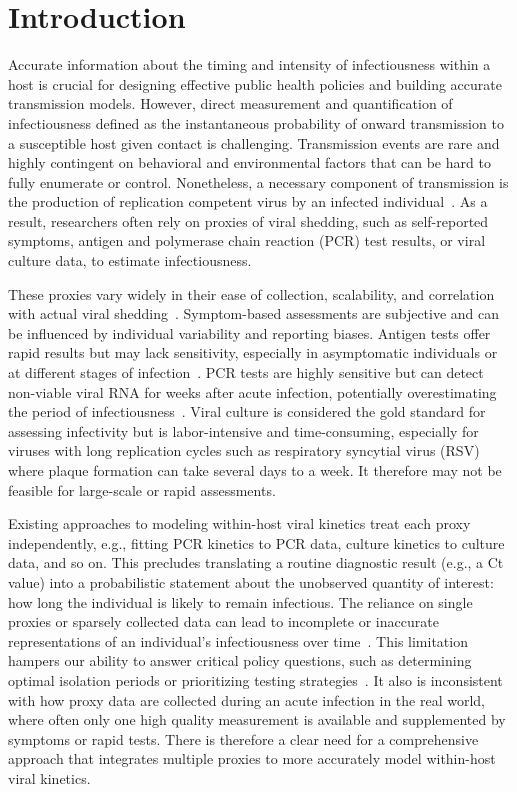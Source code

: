 \documentclass[12pt]{article}
\begin{document}
\section{Introduction} \label{sec:introduction}
Accurate information about the timing and intensity of infectiousness within a host is crucial for designing effective public health policies and building accurate transmission models. However, direct measurement and quantification of infectiousness \textemdash defined as the instantaneous probability of onward transmission to a susceptible host given contact \textemdash is challenging. Transmission events are rare and highly contingent on behavioral and environmental factors that can be hard to fully enumerate or control. Nonetheless, a necessary component of transmission is the production of replication competent virus by an infected individual~\cite{watson2015characterisation}. As a result, researchers often rely on proxies of viral shedding, such as self-reported symptoms, antigen and polymerase chain reaction (PCR) test results, or viral culture data, to estimate infectiousness.

These proxies vary widely in their ease of collection, scalability, and correlation with actual viral shedding~\cite{puhach2022sars,cevik2021sars}. Symptom-based assessments are subjective and can be influenced by individual variability and reporting biases. Antigen tests offer rapid results but may lack sensitivity, especially in asymptomatic individuals or at different stages of infection~\cite{mina2021covid}. PCR tests are highly sensitive but can detect non-viable viral RNA for weeks after acute infection, potentially overestimating the period of infectiousness~\cite{binnicker2020challenges}. Viral culture is considered the gold standard for assessing infectivity but is labor-intensive and time-consuming, especially for viruses with long replication cycles such as respiratory syncytial virus (RSV) where plaque formation can take several days to a week. It therefore may not be feasible for large-scale or rapid assessments.

Existing approaches to modeling within-host viral kinetics treat each proxy independently, e.g., fitting PCR kinetics to PCR data, culture kinetics to culture data, and so on. This precludes translating a routine diagnostic result (e.g., a Ct value) into a probabilistic statement about the unobserved quantity of interest: how long the individual is likely to remain infectious. The reliance on single proxies or sparsely collected data can lead to incomplete or inaccurate representations of an individual's infectiousness over time~\cite{he2020temporal,jones2021estimating}. This limitation hampers our ability to answer critical policy questions, such as determining optimal isolation periods or prioritizing testing strategies~\cite{quilty2021quarantine,larremore2021test}. It also is inconsistent with how proxy data are collected during an acute infection in the real world, where often only one high quality measurement is available and supplemented by symptoms or rapid tests. There is therefore a clear need for a comprehensive approach that integrates multiple proxies to more accurately model within-host viral kinetics.
\end{document}
